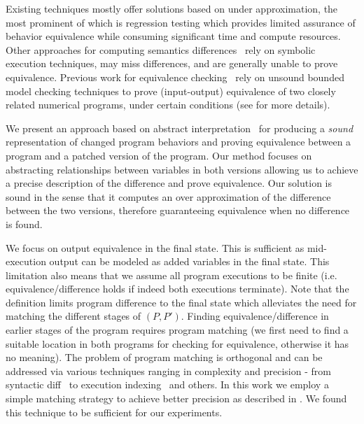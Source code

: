 Existing techniques mostly offer solutions based on  under approximation, the most prominent of which is regression testing which provides limited assurance of behavior equivalence while consuming significant time and compute resources. 
Other approaches for computing semantics differences~\cite{DwyerElbaumPerson08,EnglerRamos11} rely on symbolic execution techniques, may miss differences, and are generally unable to prove equivalence. Previous work for equivalence checking~\cite{GodlinStrichman09} rely on unsound bounded model checking techniques to prove (input-output) equivalence of two closely related numerical programs, under certain conditions (see  for more details).

We present an approach based on abstract interpretation~\cite{CousotCousot77} for producing a \emph{sound} representation of changed program behaviors and proving equivalence between a program and a patched version of the program. Our method focuses on abstracting relationships between variables in both versions allowing us to achieve a precise description of the difference and prove equivalence. Our solution is sound in the sense that it computes an over approximation of the difference between the two versions, therefore guaranteeing equivalence when no difference is found.

We focus on output equivalence in the final state. This is sufficient as mid-execution output can be modeled as added variables in the final state. This limitation also means that we assume all program executions to be finite (i.e. equivalence/difference holds if indeed both executions terminate). Note that the definition limits program difference to the final state which alleviates the need for matching the different stages of $(P,P')$. Finding equivalence/difference in earlier stages of the program requires program matching (we first need to find a suitable location in both programs for checking for equivalence, otherwise it has no meaning). The problem of program matching is orthogonal and can be addressed via various techniques ranging in complexity and precision - from syntactic diff~\cite{HuntMcIlroy75} to execution indexing~\cite{Xin:2008} and others. In this work we employ a simple matching strategy to achieve better precision as described in . We found this technique to be sufficient for our experiments.

